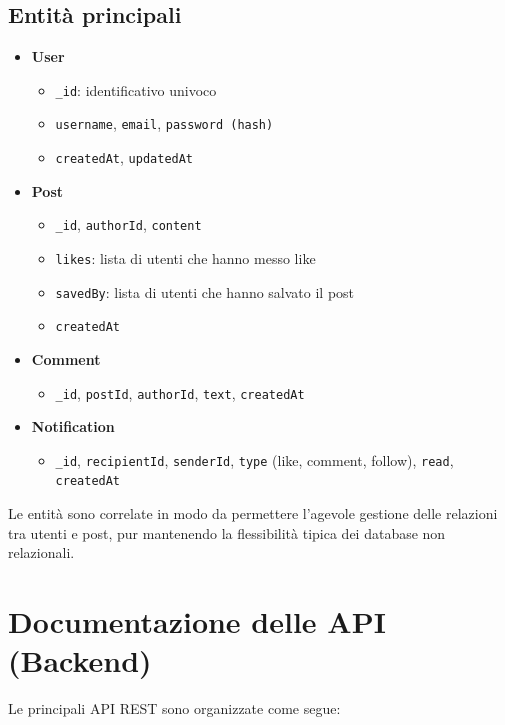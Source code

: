 \documentclass[a4paper,12pt]{article}
\begin{document}
\subsection{Entità principali}
\begin{itemize}
    \item \textbf{User}
    \begin{itemize}
        \item \texttt{\_id}: identificativo univoco
        \item \texttt{username}, \texttt{email}, \texttt{password (hash)}
        \item \texttt{createdAt}, \texttt{updatedAt}
    \end{itemize}

    \item \textbf{Post}
    \begin{itemize}
        \item \texttt{\_id}, \texttt{authorId}, \texttt{content}
        \item \texttt{likes}: lista di utenti che hanno messo like
        \item \texttt{savedBy}: lista di utenti che hanno salvato il post
        \item \texttt{createdAt}
    \end{itemize}

    \item \textbf{Comment}
    \begin{itemize}
        \item \texttt{\_id}, \texttt{postId}, \texttt{authorId}, \texttt{text}, \texttt{createdAt}
    \end{itemize}

    \item \textbf{Notification}
    \begin{itemize}
        \item \texttt{\_id}, \texttt{recipientId}, \texttt{senderId}, \texttt{type} (like, comment, follow), \texttt{read}, \texttt{createdAt}
    \end{itemize}
\end{itemize}

Le entità sono correlate in modo da permettere l’agevole gestione delle relazioni tra utenti e post, pur mantenendo la flessibilità tipica dei database non relazionali.

\section{Documentazione delle API (Backend)}
Le principali API REST sono organizzate come segue:
\end{document}
